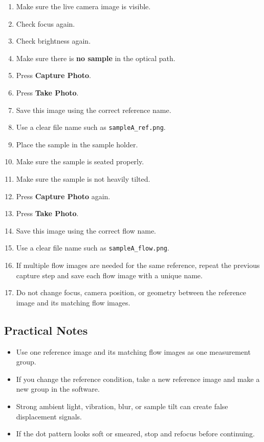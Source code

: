 \documentclass[11pt]{article}
\begin{document}
\begin{enumerate}
    \item Make sure the live camera image is visible.
    \item Check focus again.
    \item Check brightness again.
    \item Make sure there is \textbf{no sample} in the optical path.
    \item Press \textbf{Capture Photo}.
    \item Press \textbf{Take Photo}.
    \item Save this image using the correct reference name.
    \item Use a clear file name such as \texttt{sampleA\_ref.png}.
    \item Place the sample in the sample holder.
    \item Make sure the sample is seated properly.
    \item Make sure the sample is not heavily tilted.
    \item Press \textbf{Capture Photo} again.
    \item Press \textbf{Take Photo}.
    \item Save this image using the correct flow name.
    \item Use a clear file name such as \texttt{sampleA\_flow.png}.
    \item If multiple flow images are needed for the same reference, repeat the previous capture step and save each flow image with a unique name.
    \item Do not change focus, camera position, or geometry between the reference image and its matching flow images.
\end{enumerate}

\subsection{Practical Notes}

\begin{itemize}
    \item Use one reference image and its matching flow images as one measurement group.
    \item If you change the reference condition, take a new reference image and make a new group in the software.
    \item Strong ambient light, vibration, blur, or sample tilt can create false displacement signals.
    \item If the dot pattern looks soft or smeared, stop and refocus before continuing.
\end{itemize}
\end{document}
